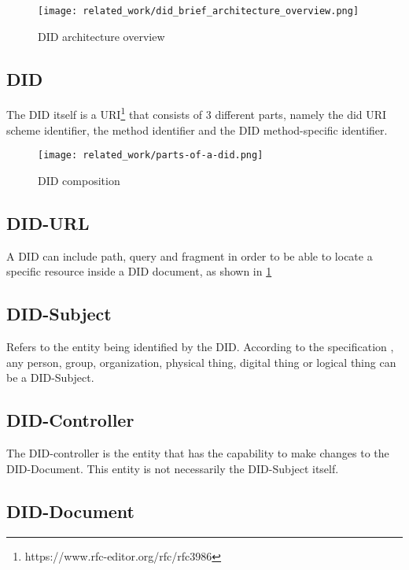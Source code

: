 \begin{figure}[H]
  \centering
  \texttt{[image: related\_work/did\_brief\_architecture\_overview.png]}
  \caption{DID architecture overview \cite{sporny_longley_sabadello_reed_steele_2021}}
  \label{fig:did_architecture}
\end{figure}

\subsection{DID}  
The DID itself is a URI\footnote{https://www.rfc-editor.org/rfc/rfc3986} that consists of 3 different parts, namely the did URI scheme identifier, the method identifier and the DID method-specific identifier.

\begin{figure}[h]
  \centering
  \texttt{[image: related\_work/parts-of-a-did.png]}
  \caption{DID composition \cite{sporny_longley_sabadello_reed_steele_2021}}
  \label{fig:did}
\end{figure}

\subsection{DID-URL}

A DID can include path, query and fragment in order to be able to locate a specific resource inside a DID document, as shown in \ref{fig:did_architecture}


\subsection{DID-Subject}

Refers to the entity being identified by the DID. According to the specification \cite{sporny_longley_sabadello_reed_steele_2021}, any person, group, organization, physical thing, digital thing or logical thing can be a DID-Subject.

\subsection{DID-Controller}

The DID-controller is the entity that has the capability to make changes to the DID-Document. This entity is not necessarily the DID-Subject itself.
  
\subsection{DID-Document}

